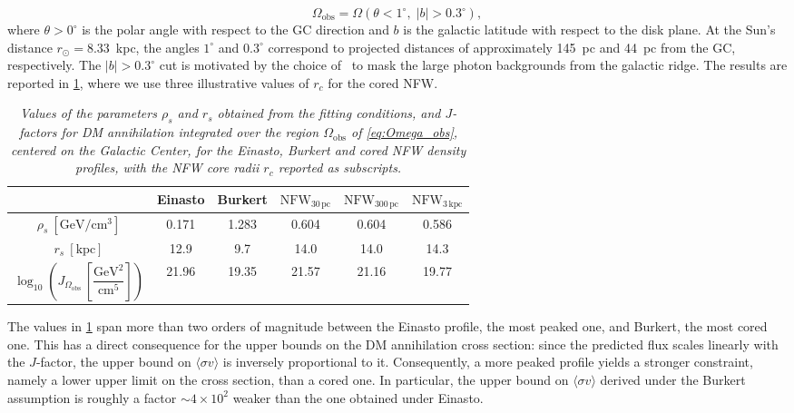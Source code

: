 \begin{equation}
\label{eq:Omega_obs}
    \Omega_\mathrm{obs} = \Omega(\theta < 1^\circ,\; |b| > 0.3^\circ),
\end{equation}
where $\theta > 0^\circ$ is the polar angle with respect to the GC direction 
and $b$ is the galactic latitude with respect to the disk plane. At the Sun's 
distance $r_\odot = 8.33$~kpc, the angles $1^\circ$ and $0.3^\circ$ correspond 
to projected distances of approximately 145~pc and 44~pc from the GC, respectively. 
The $|b| > 0.3^\circ$ cut is motivated by the choice of~\cite{Abdalla_2022} to mask the large photon backgrounds from the galactic ridge.
The results are reported in \cref{tab:gc_jfactors}, where we use three illustrative values of $r_c$ for the cored NFW.



\begin{table}[H]
\centering
\begin{tabular}{c|c|c|c|c|c}
\hline
 & Einasto & Burkert & $\mathrm{NFW}_{30\,\mathrm{pc}}$ & $\mathrm{NFW}_{300\,\mathrm{pc}}$ & $\mathrm{NFW}_{3\,\mathrm{kpc}}$ \\
\hline
$\rho_s~[\mathrm{GeV/cm^3}]$
& 0.171 & 1.283 & 0.604 & 0.604 & 0.586 \\
\hline
$r_s~[\mathrm{kpc}]$
& 12.9 & 9.7 & 14.0 & 14.0 & 14.3 \\
\hline
$\log_{10}\!\left(J_{\Omega_{\mathrm{obs}}}\,\left[\dfrac{\mathrm{GeV}^2}{\mathrm{cm}^5}\right]\right)$
& 21.96 & 19.35 & 21.57 & 21.16 & 19.77 \\
\hline
\end{tabular}
\caption{\emph{Values of the parameters $\rho_s$ and $r_s$ obtained from the
fitting conditions, and $J$-factors for DM annihilation integrated over the
region $\Omega_{\mathrm{obs}}$ of \cref{eq:Omega_obs}, centered on the
Galactic Center, for the Einasto, Burkert and cored NFW density profiles,
with the NFW core radii $r_c$ reported as subscripts.}}
\label{tab:gc_jfactors}
\end{table}

The values in \cref{tab:gc_jfactors} span more than two orders of magnitude 
between the Einasto profile, the most peaked one, and Burkert, the most cored one.
This has a direct consequence for 
the upper bounds on the DM annihilation cross section: since the predicted flux scales linearly with the
$J$-factor, the upper bound on $\langle \sigma v \rangle$ is inversely 
proportional to it. Consequently, a more peaked profile yields a stronger constraint, namely a lower upper limit on the cross section, than a cored one.
In particular, the upper bound on $\langle \sigma v \rangle$ derived under the Burkert assumption 
is roughly a factor $\sim 4 \times 10^2$ weaker than the one obtained under Einasto.


